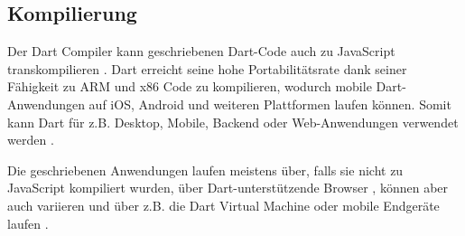 \subsection{Kompilierung}
\label{subsec:Dart:Kompilierung}
Der Dart Compiler kann geschriebenen Dart-Code auch zu JavaScript transkompilieren \cite{book:Dart:StartGuideDart_SanjibSinha, book:Dart:DPL_GiladBracha, article:Dart:JavaAndDart_AfafMirghaniHassan}.
Dart erreicht seine hohe Portabilitätsrate dank seiner Fähigkeit zu ARM und x86 Code zu kompilieren, wodurch mobile Dart-Anwendungen auf iOS, Android und weiteren Plattformen laufen können.
Somit kann Dart für z.B. Desktop, Mobile, Backend oder Web-Anwendungen verwendet werden \cite{book:Dart:StartGuideDart_SanjibSinha}.

\noindent
Die geschriebenen Anwendungen laufen meistens über, falls sie nicht zu JavaScript kompiliert wurden, über Dart-unterstützende Browser \cite{article:Dart:JavaAndDart_AfafMirghaniHassan}, können aber auch variieren und über z.B. die Dart Virtual Machine oder mobile Endgeräte laufen \cite{book:Dart:StartGuideDart_SanjibSinha}.